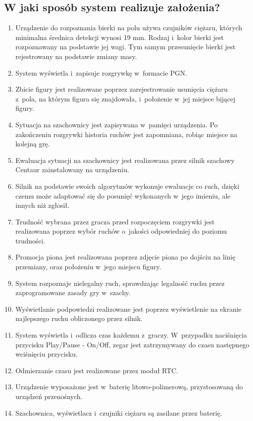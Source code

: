 \documentclass[12pt]{article}
\begin{document}
\subsection{W jaki sposób system realizuje założenia?}
\begin{enumerate}
\item Urządzenie do rozpoznania bierki na polu używa czujników ciężaru, których minimalna średnica detekcji wynosi 19 mm. Rodzaj i kolor bierki jest rozpoznawany na podstawie jej wagi. Tym samym przesunięcie bierki jest rejestrowany na podstawie zmiany masy.
\item System wyświetla i zapisuje rozgrywkę w formacie PGN.
\item Zbicie figury jest realizowane poprzez zarejestrowanie usunięcia ciężaru z pola, na którym figura się znajdowała, i położenie w jej miejsce bijącej figury.
\item Sytuacja na szachownicy jest zapisywana w pamięci urządzenia. Po zakończeniu rozgrywki historia ruchów jest zapomniana, robiąc miejsce na kolejną grę.
\item Ewaluacja sytuacji na szachownicy jest realizowana przez silnik szachowy Centaur zainstalowany na urządzeniu.
\item Silnik na podstawie swoich algorytmów wykonuje ewaluacje co ruch, dzięki czemu może adaptować się do posunięć wykonanych w jego imieniu, ale innych niż zgłosił.
\item Trudność wybrana przez gracza przed rozpoczęciem rozgrywki jest realizowana poprzez wybór ruchów o jakości odpowiedniej do poziomu trudności. 
\item Promocja piona jest realizowana poprzez zdjęcie piona po dojściu na linię przemiany, oraz położeniu w jego miejscu figury.
\item System rozpoznaje nielegalny ruch, sprawdzając legalność ruchu przez zaprogramowane zasady gry w szachy.
\item Wyświetlanie podpowiedzi realizowane jest poprzez wyświetlenie na ekranie najlepszego ruchu obliczonego przez silnik.
\item System wyświetla i odlicza czas każdemu z graczy. W przypadku naciśnięcia przycisku Play/Pause - On/Off, zegar jest zatrzymywany do czasu następnego wciśnięciu przycisku.
\item Odmierzanie czasu jest realizowane przez moduł RTC.
\item Urządzenie wyposażone jest w baterię litowo-polimerową, przystosowaną do urządzeń przenośnych.
\item Szachownica, wyświetlacz i czujniki ciężaru są zasilane przez baterię.

\end{enumerate}
\end{document}
